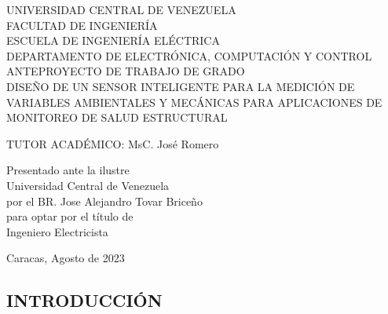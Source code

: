 \documentclass[12pt,letterpaper]{article}
\author{} %
\date{FECHA} %
\begin{document}
\renewcommand{\listfigurename}{Lista de Figuras}
\renewcommand{\listtablename}{Lista de Tablas}
\renewcommand{\contentsname}{Lista de Contenidos}
\renewcommand{\figurename}{Figura}
\renewcommand{\tablename}{Tabla}


\begin{center}

	\vspace{3cm} UNIVERSIDAD CENTRAL DE VENEZUELA \\
	FACULTAD DE INGENIERÍA \\
	ESCUELA DE INGENIERÍA ELÉCTRICA \\
	DEPARTAMENTO DE ELECTRÓNICA, COMPUTACIÓN Y CONTROL\\
	ANTEPROYECTO DE TRABAJO DE GRADO \\

	\vspace{7cm} DISEÑO DE UN SENSOR INTELIGENTE PARA LA MEDICIÓN DE VARIABLES AMBIENTALES Y MECÁNICAS PARA APLICACIONES DE MONITOREO DE SALUD ESTRUCTURAL
\end{center}


\vspace{6cm}

\begin{flushleft}
	TUTOR ACADÉMICO: MsC. José Romero \\
\end{flushleft}


\begin{flushright}

	Presentado ante la ilustre\\
	Universidad Central de Venezuela\\
	por el BR. Jose Alejandro Tovar Briceño \\
	para optar por el título de \\
	Ingeniero Electricista   \\

\end{flushright}

\begin{center}
	Caracas, Agosto de 2023
\end{center}


\vspace{2cm}
\thispagestyle{empty}
\newpage


\begin{center}
	\section*{ INTRODUCCIÓN}
\end{center}
\end{document}
